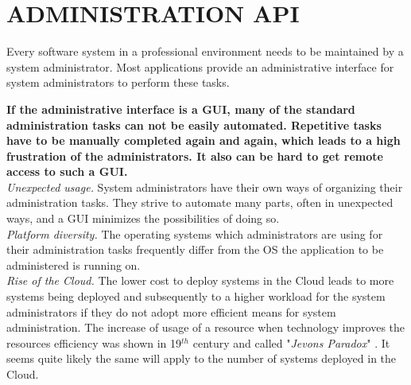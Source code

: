 \newpage

\section*{ADMINISTRATION API}
Every software system in a professional environment needs to be maintained by a system administrator.
Most applications provide an administrative interface for system administrators to perform these tasks.
\begin{center}
  
\end{center}
\textbf{If the administrative interface is a GUI, many of the standard administration tasks can not be easily automated. Repetitive tasks have to be manually completed again and again, which leads to a high frustration of the administrators. It also can be hard to get remote access to such a GUI.}\\

\textit{Unexpected usage.} System administrators have their own ways of organizing their administration tasks. They strive to automate many parts, often in unexpected ways, and a GUI minimizes the possibilities of doing so.\\

\textit{Platform diversity.} The operating systems which administrators are using for their administration tasks frequently
differ from the OS the application to be administered is running on.\\

\textit{Rise of the Cloud.} The lower cost to deploy systems in the Cloud leads to more systems being deployed and subsequently to a higher workload for the system administrators if they do not adopt more efficient means for system administration. 
The increase of usage of a resource when technology improves the resources
efficiency was shown in 19$^{th}$ century and called "\textit{Jevons Paradox}" \cite{Polimeni2008}. It seems quite likely the same will apply to the number of systems deployed in the Cloud.\\

